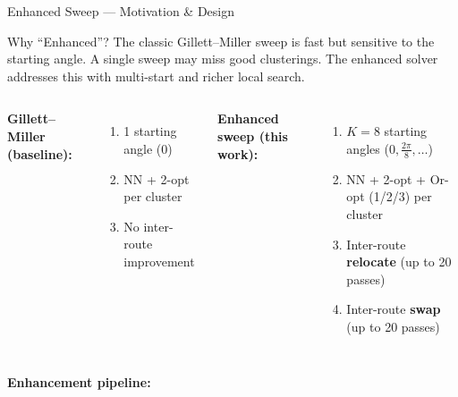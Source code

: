 \documentclass{beamer}
\begin{document}
\begin{frame}{Enhanced Sweep — Motivation \& Design}

\begin{block}{Why ``Enhanced''?}
The classic Gillett--Miller sweep is fast but sensitive to the starting
angle. A single sweep may miss good clusterings. The enhanced solver
addresses this with multi-start and richer local search.
\end{block}

\vspace{0.3em}

\begin{columns}[T]

\textbf{Gillett--Miller (baseline):}
\begin{enumerate}\small
  \item 1 starting angle (0)
  \item NN + 2-opt per cluster
  \item No inter-route improvement
\end{enumerate}

\textbf{Enhanced sweep (this work):}
\begin{enumerate}\small
  \item $K=8$ starting angles ($0, \frac{2\pi}{8}, \ldots$)
  \item NN + 2-opt + Or-opt (1/2/3) per cluster
  \item Inter-route \textbf{relocate} (up to 20 passes)
  \item Inter-route \textbf{swap} (up to 20 passes)
\end{enumerate}
\end{columns}

\vspace{0.3em}
\begin{center}
\small\textbf{Enhancement pipeline:}\\[0.2em]
\end{center}

\end{frame}
\end{document}

